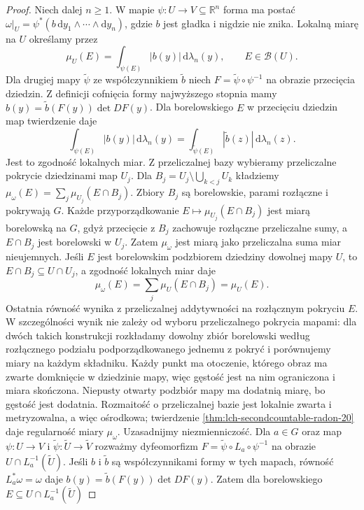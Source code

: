 \begin{proof}
Niech dalej $n\ge1$. W mapie $\psi:U\to V\subseteq\mathbb R^n$
forma ma postać $\omega|_U=\psi^*(b\,\mathrm dy_1
\wedge\cdots\wedge\mathrm dy_n)$, gdzie $b$ jest
gładka i nigdzie nie znika. Lokalną miarę na $U$
określamy przez
\[
 \mu_U(E)=\int_{\psi(E)}|b(y)|\,\mathrm d\lambda_n(y),
 \qquad E\in\mathcal B(U).
\]
Dla drugiej mapy $\widetilde\psi$ ze współczynnikiem
$\widetilde b$ niech
$F=\widetilde\psi\circ\psi^{-1}$ na obrazie przecięcia
dziedzin. Z definicji cofnięcia formy najwyższego
stopnia mamy $b(y)=\widetilde b(F(y))\det DF(y)$.
Dla borelowskiego $E$ w przecięciu dziedzin map
twierdzenie  daje
\[
 \int_{\psi(E)}|b(y)|\,\mathrm d\lambda_n(y)
 =\int_{\widetilde\psi(E)}|\widetilde b(z)|
     \,\mathrm d\lambda_n(z).
\]
Jest to zgodność lokalnych miar. Z przeliczalnej bazy wybieramy
przeliczalne pokrycie dziedzinami map $U_j$.
Dla $B_j=U_j\setminus\bigcup_{k<j}U_k$ kładziemy
$\mu_\omega(E)=\sum_j\mu_{U_j}(E\cap B_j)$.
Zbiory $B_j$ są borelowskie, parami rozłączne
i pokrywają $G$. Każde przyporządkowanie
$E\mapsto\mu_{U_j}(E\cap B_j)$ jest miarą borelowską
na $G$, gdyż przecięcie z $B_j$ zachowuje rozłączne
przeliczalne sumy, a $E\cap B_j$ jest borelowski
w $U_j$. Zatem $\mu_\omega$ jest miarą jako
przeliczalna suma miar nieujemnych. Jeśli $E$ jest
borelowskim podzbiorem dziedziny dowolnej mapy $U$,
to $E\cap B_j\subseteq U\cap U_j$, a zgodność
lokalnych miar daje
\[
 \mu_\omega(E)=\sum_j\mu_U(E\cap B_j)=\mu_U(E).
\]
Ostatnia równość wynika z przeliczalnej addytywności
na rozłącznym pokryciu $E$. W szczególności wynik
nie zależy od wyboru przeliczalnego pokrycia mapami:
dla dwóch takich konstrukcji rozkładamy dowolny
zbiór borelowski według rozłącznego podziału
podporządkowanego jednemu z pokryć i porównujemy
miary na każdym składniku.
Każdy punkt ma otoczenie, którego obraz ma zwarte
domknięcie w dziedzinie mapy, więc gęstość jest
na nim ograniczona i miara skończona. Niepusty
otwarty podzbiór mapy ma dodatnią miarę, bo gęstość
jest dodatnia. Rozmaitość o przeliczalnej bazie
jest lokalnie zwarta i metryzowalna, a więc
ośrodkowa; twierdzenie
\ref{thm:lch-secondcountable-radon-20}
daje regularność miary $\mu_\omega$.
Uzasadnijmy niezmienniczość. Dla $a\in G$ oraz
map $\psi:U\to V$ i $\widetilde\psi:\widetilde U
\to\widetilde V$ rozważmy dyfeomorfizm
$F=\widetilde\psi\circ L_a\circ\psi^{-1}$
na obrazie $U\cap L_a^{-1}(\widetilde U)$.
Jeśli $b$ i $\widetilde b$ są współczynnikami formy
w tych mapach, równość $L_a^*\omega=\omega$ daje
$b(y)=\widetilde b(F(y))\det DF(y)$. Zatem dla
borelowskiego $E\subseteq U\cap L_a^{-1}(\widetilde U)$

\end{proof}
